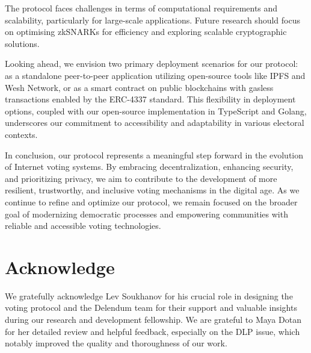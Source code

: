 \documentclass[runningheads]{llncs}
\begin{document}
The protocol faces challenges in terms of computational requirements and scalability, particularly for large-scale applications. Future research should focus on optimising zkSNARKs for efficiency and exploring scalable cryptographic solutions.

Looking ahead, we envision two primary deployment scenarios for our protocol: as a standalone peer-to-peer application utilizing open-source tools like IPFS and Wesh Network, or as a smart contract on public blockchains with gasless transactions enabled by the ERC-4337 standard. This flexibility in deployment options, coupled with our open-source implementation in TypeScript and Golang, underscores our commitment to accessibility and adaptability in various electoral contexts.

In conclusion, our protocol represents a meaningful step forward in the evolution of Internet voting systems. By embracing decentralization, enhancing security, and prioritizing privacy, we aim to contribute to the development of more resilient, trustworthy, and inclusive voting mechanisms in the digital age. As we continue to refine and optimize our protocol, we remain focused on the broader goal of modernizing democratic processes and empowering communities with reliable and accessible voting technologies.

\section*{Acknowledge}
We gratefully acknowledge Lev Soukhanov for his crucial role in designing the voting protocol and the Delendum team for their support and valuable insights during our research and development fellowship. We are grateful to Maya Dotan for her detailed review and helpful feedback, especially on the DLP issue, which notably improved the quality and thoroughness of our work.




\end{document}
